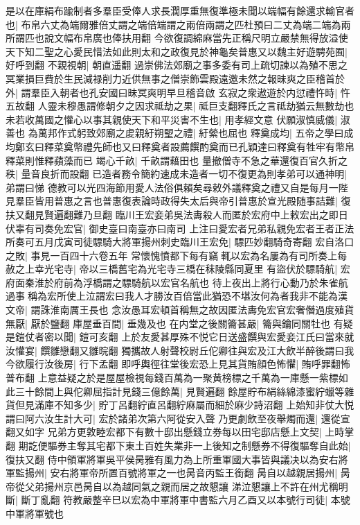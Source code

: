 是以在庫絹布踰制者多羣臣受俸人求長濶厚重無復準極未聞以端幅有餘還求輸官者也|{
	布帛六丈為端爾雅倍丈謂之端倍端謂之兩倍兩謂之匹杜預曰二丈為端二端為兩所謂匹也說文幅布帛廣也俸扶用翻}
今欲復調綿麻當先正稱尺明立嚴禁無得放溢使天下知二聖之心愛民惜法如此則太和之政復見於神龜矣普惠又以魏主好遊騁苑囿|{
	好呼到翻}
不親視朝|{
	朝直遥翻}
過崇佛法郊廟之事多委有司上疏切諫以為殖不思之冥業損巨費於生民減禄削力近供無事之僧崇飾雲殿遠邀未然之報昧爽之臣稽首於外|{
	謂羣臣入朝者也孔安國曰昧冥爽明早旦稽音啟}
玄寂之衆遨遊於内愆禮忤時|{
	忤五故翻}
人靈未穆愚謂修朝夕之因求祗劫之果|{
	祗巨支翻釋氏之言祗劫猶云無數劫也}
未若收萬國之懽心以事其親使天下和平災害不生也|{
	用孝經文意}
伏願淑慎威儀|{
	淑善也}
為萬邦作式躬致郊廟之䖍親紆朔朢之禮|{
	紆縈也屈也}
釋奠成均|{
	五帝之學曰成均鄭玄曰釋菜奠幣禮先師也又曰釋奠者設薦饌酌奠而已孔穎達曰釋奠有牲牢有幣帛釋菜則惟釋蘋藻而已}
竭心千畝|{
	千畝謂藉田也}
量撤僧寺不急之華還復百官久折之秩|{
	量音良折而設翻}
已造者務令簡約速成未造者一切不復更為則孝弟可以通神明|{
	弟謂曰悌}
德教可以光四海節用愛人法俗俱賴矣尋敕外議釋奠之禮又自是每月一陛見羣臣皆用普惠之言也普惠復表論時政得失太后與帝引普惠於宣光殿随事詰難|{
	復扶又翻見賢遍翻難乃旦翻}
臨川王宏妾弟吳法夀殺人而匿於宏府中上敕宏出之即日伏辜有司奏免宏官|{
	御史臺曰南臺亦曰南司}
上注曰愛宏者兄弟私親免宏者王者正法所奏可五月戊寅司徒驃騎大將軍揚州刺史臨川王宏免|{
	驃匹妙翻騎奇寄翻}
宏自洛口之敗|{
	事見一百四十六卷五年}
常懷愧憤都下每有竊輒以宏為名屢為有司所奏上每赦之上幸光宅寺|{
	帝以三橋舊宅為光宅寺三橋在秣陵縣同夏里}
有盜伏於驃騎航|{
	宏府面秦淮於府前為浮橋謂之驃騎航以宏官名航也}
待上夜出上將行心動乃於朱雀航過事稱為宏所使上泣謂宏曰我人才勝汝百倍當此猶恐不堪汝何為者我非不能為漢文帝|{
	謂誅淮南厲王長也}
念汝愚耳宏頓首稱無之故因匿法夀免宏官宏奢僭過度殖貨無厭|{
	厭於鹽翻}
庫屋垂百間|{
	垂幾及也}
在内堂之後關籥甚嚴|{
	籥與鑰同關牡也}
有疑是鎧仗者密以聞|{
	鎧可亥翻}
上於友愛甚厚殊不悦它日送盛饌與宏愛妾江氏曰當來就汝懽宴|{
	饌雛戀翻又雛晥翻}
獨攜故人射聲校尉丘佗卿往與宏及江大飲半醉後謂曰我今欲履行汝後房|{
	行下孟翻}
即呼輿徑往堂後宏恐上見其貨賄顔色怖懼|{
	賄呼罪翻怖普布翻}
上意益疑之於是屋屋檢視每錢百萬為一聚黄榜標之千萬為一庫懸一紫標如此三十餘間上與佗卿屈指計見錢三億餘萬|{
	見賢遍翻}
餘屋貯布絹絲綿漆蜜紵蠟等雜貨但見滿庫不知多少|{
	貯丁呂翻紵直呂翻紵麻屬而細於麻少詩沼翻}
上始知非仗大悦謂曰阿六汝生計大可|{
	宏於諸弟次第六阿從安入聲}
乃更劇飲至夜舉燭而還|{
	還從宣翻又如字}
兄弟方更敦睦宏都下有數十邸出懸錢立券每以田宅邸店懸上文契|{
	上時掌翻}
期訖便驅券主奪其宅都下東土百姓失業非一上後知之制懸券不得復驅奪自此始|{
	復扶又翻}
侍中領軍將軍吳平侯昺雅有風力為上所重軍國大事皆與議决以為安右將軍監揚州|{
	安右將軍帝所置百號將軍之一也昺音丙監王銜翻}
昺自以越親居揚州|{
	昺帝從父弟揚州京邑昺自以為越同氣之親而居之故懇讓}
涕泣懇讓上不許在州尤稱明斷|{
	斷丁亂翻}
符教嚴整辛巳以宏為中軍將軍中書監六月乙酉又以本號行司徒|{
	本號中軍將軍號也}


